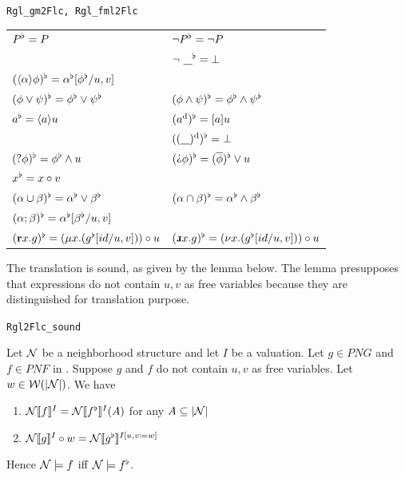\begin{bdefinition}

\texttt{Rgl\_gm2Flc, Rgl\_fml2Flc}

\begin{tabular}{l l}
    $ P^{\flat} = P$ 
    & $\neg P ^{\flat} = \neg P$ \\
    & $\neg\  \underline{\hspace{8pt}}^{\flat} = \bot$ \\
    $(\langle\alpha\rangle\phi)^{\flat} = \alpha^{\flat}[\phi^{\flat}/u,v]$ \\
    $(\phi\vee\psi)^{\flat}=\phi^{\flat}\vee \psi^{\flat}$ 
    & $(\phi\wedge\psi)^{\flat}=\phi^{\flat}\wedge \psi^{\flat}$ \\
    $a^{\flat} =\langle a\rangle u$ 
    & $(a^\text{d})^{\flat} = [a] u$ \\
    & $((\underline{\hspace{8pt}})^\text{d})^{\flat} = \bot$ \\
    $(\text{?}\phi)^{\flat}=\phi^{\flat}\wedge u$
    & $\RF{(\DTest\phi)}=\RF{(\overline\phi)}\vee u$ \\
    $x^{\flat} = x\circ v$ \\
    $(\alpha\cup\beta)^{\flat} =\alpha^{\flat} \vee \beta^{\flat}$ 
    & $(\alpha\cap\beta)^{\flat} =\alpha^{\flat} \wedge \beta^{\flat}$ \\
    $(\alpha;\beta)^{\flat}=\alpha^{\flat}[\beta^{\flat}/u,v]$ \\
    $(\textbf{r} x. g)^{\flat}=(\mu x.(g^{\flat}[id/u,v]))\circ u$ 
    & $\RF{(\DRec x. g)}=(\nu x.(\RF{g}[id/u,v]))\circ u$  \\
\end{tabular}
\end{bdefinition}

The translation is sound, as given by the lemma below. The lemma presupposes that \RGL{} expressions do not contain $u,v$ as free variables because they are distinguished for translation purpose.

\begin{blemma}[($\RF{}$) is Sound]
\label{lem:RGL2FLC_sound}
\texttt{Rgl2Flc\_sound}

Let $\mathcal N$ be a neighborhood structure and let $I$ be a valuation. Let $g\in PNG$ and $f\in PNF$ in \RGL{}. Suppose $g$ and $f$ do not contain $u,v$ as free variables. Let $w\in \mathcal W(|\mathcal N|)$. We have

\begin{enumerate}
    \item $\mathcal N[\![ f ]\!]^I = \mathcal N[\![ f^{\flat}]\!]^I(A)$ for any $A\subseteq |\mathcal N|$
    \item $\mathcal N[\![ g ]\!]^I \circ w = \mathcal N[\![ g^{\flat}]\!]^{I[u,v\coloneq w]}$
\end{enumerate}

Hence $\mathcal N \models f$ iff $\mathcal N\models f^{\flat}$.
\end{blemma}

